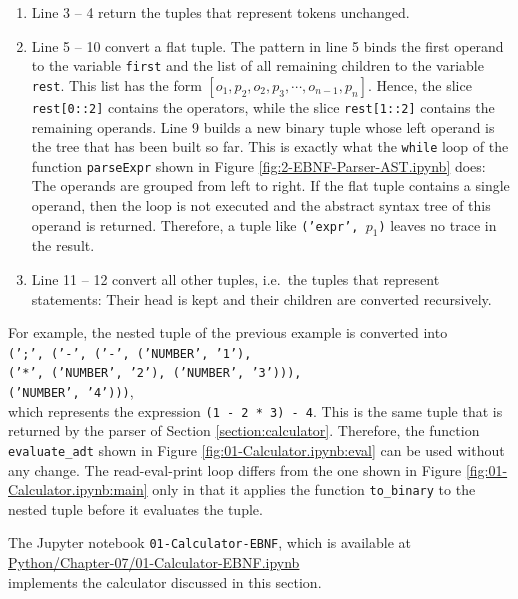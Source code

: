 \begin{enumerate}
\item Line 3 -- 4 return the tuples that represent tokens unchanged.
\item Line 5 -- 10 convert a flat tuple.  The pattern in line 5 binds the first operand to the variable
      \texttt{first} and the list of all remaining children to the variable \texttt{rest}.  This list has the
      form $[o_1, p_2, o_2, p_3, \cdots, o_{n-1}, p_n]$.  Hence, the slice \texttt{rest[0::2]} contains the
      operators, while the slice \texttt{rest[1::2]} contains the remaining operands.  Line 9 builds a new
      binary tuple whose left operand is the tree that has been built so far.  This is exactly what the
      \texttt{while} loop of the function \texttt{parseExpr} shown in Figure \ref{fig:2-EBNF-Parser-AST.ipynb}
      does:  The operands are grouped from left to right.  If the flat tuple contains a single operand, then
      the loop is not executed and the abstract syntax tree of this operand is returned.  Therefore, a tuple
      like \texttt{('expr', $p_1$)} leaves no trace in the result.
\item Line 11 -- 12 convert all other tuples, i.e.~the tuples that represent statements:  Their head is kept and
      their children are converted recursively.
\end{enumerate}
For example, the nested tuple of the previous example is converted into
\\[0.2cm]
\hspace*{0.3cm}
\texttt{(';', ('-', ('-', ('NUMBER', '1'),}
\\
\hspace*{4.68cm}
\texttt{('*', ('NUMBER', '2'), ('NUMBER', '3'))),}
\\
\hspace*{3.21cm}
\texttt{('NUMBER', '4')))},
\\[0.2cm]
which represents the expression \texttt{(1 - 2 * 3) - 4}.  This is the same tuple that is returned by the
parser of Section \ref{section:calculator}.  Therefore, the function \texttt{evaluate\_adt} shown in Figure
\ref{fig:01-Calculator.ipynb:eval} can be used without any change.  The read-eval-print loop differs from the
one shown in Figure \ref{fig:01-Calculator.ipynb:main} only in that it applies the function
\texttt{to\_binary} to the nested tuple before it evaluates the tuple.

The Jupyter notebook \texttt{01-Calculator-EBNF}, which is available at
\\[0.2cm]
\hspace*{1.3cm}
\href{https://github.com/karlstroetmann/Formal-Languages/blob/master/Python/Chapter-07/01-Calculator-EBNF.ipynb}{Python/Chapter-07/01-Calculator-EBNF.ipynb}
\\[0.2cm]
implements the calculator discussed in this section.

